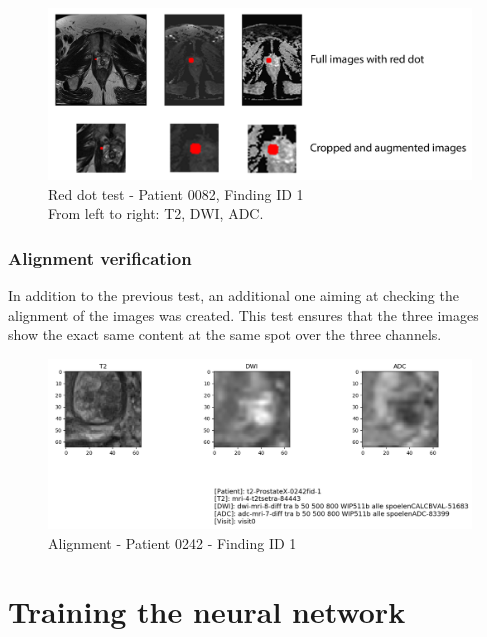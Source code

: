 \begin{figure}[!h]
\centering
\includegraphics[width=\textwidth, keepaspectratio=true]{./figures/test_red_dot.png}
\caption{Red dot test - Patient 0082, Finding ID 1\\From left to right: T2, DWI, ADC.}
\label{fig:reddot}
\end{figure}



\subsubsection{Alignment verification}
In addition to the previous test, an additional one aiming at checking the alignment of the images was created. This test ensures that the three images show the exact same content at the same spot over the three channels. 

\begin{figure}[!h]
\centering
\includegraphics[width=\textwidth, keepaspectratio=true]{./figures/alignment.png}
\caption{Alignment - Patient 0242 - Finding ID 1}
\label{fig:alignment}
\end{figure}




\section{Training the neural network}
